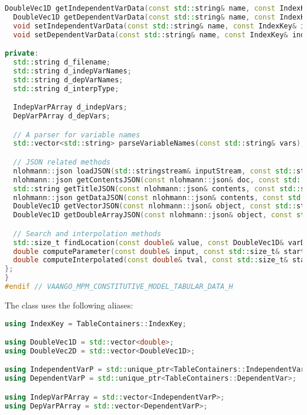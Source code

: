 \begin{lstlisting}[language=Cpp]
  DoubleVec1D getIndependentVarData(const std::string& name, const IndexKey& index) const;
  DoubleVec1D getDependentVarData(const std::string& name, const IndexKey& index) const;
  void setIndependentVarData(const std::string& name, const IndexKey& index, const DoubleVec1D& data);
  void setDependentVarData(const std::string& name, const IndexKey& index, const DoubleVec1D& data);

private:
  std::string d_filename;
  std::string d_indepVarNames;
  std::string d_depVarNames;
  std::string d_interpType;

  IndepVarPArray d_indepVars;
  DepVarPArray d_depVars;

  // A parser for variable names
  std::vector<std::string> parseVariableNames(const std::string& vars);

  // JSON related methods
  nlohmann::json loadJSON(std::stringstream& inputStream, const std::string& fileName);
  nlohmann::json getContentsJSON(const nlohmann::json& doc, const std::string& fileName);
  std::string getTitleJSON(const nlohmann::json& contents, const std::string& fileName);
  nlohmann::json getDataJSON(const nlohmann::json& contents, const std::string& fileName);
  DoubleVec1D getVectorJSON(const nlohmann::json& object, const std::string key, const std::string& tableFile);
  DoubleVec1D getDoubleArrayJSON(const nlohmann::json& object, const std::string key, const std::string& tableFile);

  // Search and interpolation methods
  std::size_t findLocation(const double& value, const DoubleVec1D& varData) const;
  double computeParameter(const double& input, const std::size_t& startIndex, const DoubleVec1D& data) const;
  double computeInterpolated(const double& tval, const std::size_t& startIndex, const DoubleVec1D& data) const;
};
}
#endif // VAANGO_MPM_CONSTITUTIVE_MODEL_TABULAR_DATA_H
\end{lstlisting}

The  class uses the following aliases:
\begin{lstlisting}[language=Cpp]
using IndexKey = TableContainers::IndexKey;

using DoubleVec1D = std::vector<double>;
using DoubleVec2D = std::vector<DoubleVec1D>;

using IndependentVarP = std::unique_ptr<TableContainers::IndependentVar>;
using DependentVarP = std::unique_ptr<TableContainers::DependentVar>;

using IndepVarPArray = std::vector<IndependentVarP>;
using DepVarPArray = std::vector<DependentVarP>;
\end{lstlisting}

